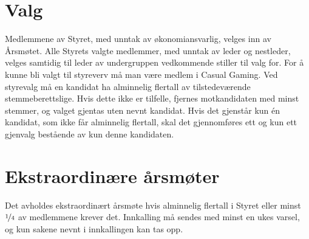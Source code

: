 \section{Valg}
Medlemmene av Styret, med unntak av økonomiansvarlig, velges inn av Årsmøtet. Alle Styrets valgte medlemmer, med unntak av leder og nestleder, velges samtidig til leder av undergruppen vedkommende stiller til valg for. For å kunne bli valgt til styreverv må man være medlem i Casual Gaming. Ved styrevalg må en kandidat ha alminnelig flertall av tilstedeværende stemmeberettslige. Hvis dette ikke er tilfelle, fjernes motkandidaten med minst stemmer, og valget gjentas uten nevnt kandidat. Hvis det gjenstår kun én kandidat, som ikke får alminnelig flertall, skal det gjennomføres ett og kun ett gjenvalg bestående av kun denne kandidaten.

\section{Ekstraordinære årsmøter}
Det avholdes ekstraordinært årsmøte hvis alminnelig flertall i Styret eller minst $\nicefrac{1}{4}$ av medlemmene krever det. Innkalling må sendes med minst en ukes varsel, og kun sakene nevnt i innkallingen kan tas opp.
